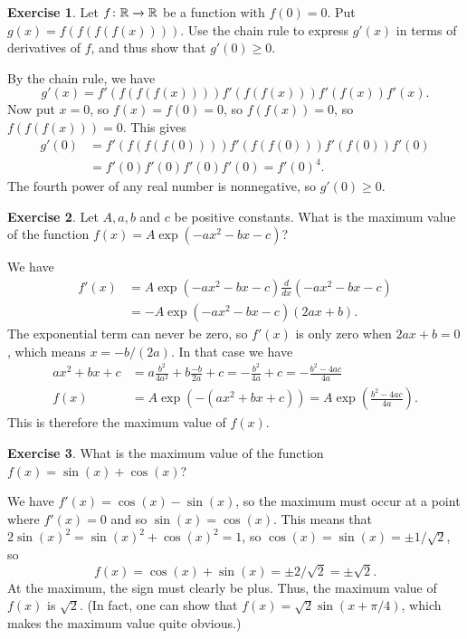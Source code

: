 \documentclass[a4paper]{amsart}
\theoremstyle{definition}
\newtheorem{exercise}{Exercise}[section]
\newenvironment{solution}{{\noindent \bf Solution:}}{}
\begin{document}
\begin{exercise}\label{ex-fix-pos}
Let $f\colon{\mathbb{R}}\xrightarrow{}{\mathbb{R}}$ be a function with $f(0)=0$.  Put
 $g(x)=f(f(f(f(x))))$.  Use the chain rule to express $g'(x)$
 in terms of derivatives of $f$, and thus show that
 $g'(0)\geq 0$.
\end{exercise}
\begin{solution}
By the chain rule, we have
 \[ g'(x) = f'(f(f(f(x)))) f'(f(f(x))) f'(f(x)) f'(x). \]
 Now put $x=0$, so $f(x)=f(0)=0$, so $f(f(x))=0$, so $f(f(f(x)))=0$.
 This gives
 \begin{align*}
  g'(0) &= f'(f(f(f(0)))) f'(f(f(0))) f'(f(0)) f'(0) \\
        &= f'(0) f'(0) f'(0) f'(0) = f'(0)^4.
 \end{align*}
 The fourth power of any real number is nonnegative, so
 $g'(0)\geq 0$.
\end{solution}
\begin{exercise}\label{ex-gaussmax}
Let $A,a,b$ and $c$ be positive constants.  What is the
 maximum value of the function $f(x)=A\exp(-ax^2-bx-c)$?
\end{exercise}
\begin{solution}
We have 
 \begin{align*}
  f'(x) &= A\exp(-ax^2-bx-c)\frac{d}{dx}(-ax^2-bx-c) \\
        &= -A\exp(-ax^2-bx-c)(2ax+b).
 \end{align*}
 The exponential term can never be zero, so $f'(x)$ is only
 zero when $2ax+b=0$, which means $x=-b/(2a)$.  In that case
 we have
 \begin{align*}
  ax^2+bx+c &= a\frac{b^2}{4a^2} +b\frac{-b}{2a} + c 
             = -\frac{b^2}{4a}+c  = -\frac{b^2-4ac}{4a} \\
  f(x) &= A\exp(-(ax^2+bx+c))
        = A\exp\left(\frac{b^2-4ac}{4a}\right).
 \end{align*}
 This is therefore the maximum value of $f(x)$.
\end{solution}
\begin{exercise}\label{ex-sincosmax}
What is the maximum value of the function
 $f(x)=\sin(x)+\cos(x)$?
\end{exercise}
\begin{solution}
We have $f'(x)=\cos(x)-\sin(x)$, so the maximum must occur
 at a point where $f'(x)=0$ and so $\sin(x)=\cos(x)$.  This
 means that $2\sin(x)^2=\sin(x)^2+\cos(x)^2=1$, so
 $\cos(x)=\sin(x)=\pm1/\sqrt{2}$, so
 \[ f(x)=\cos(x)+\sin(x)=\pm 2/\sqrt{2}=\pm\sqrt{2}. \]
 At the maximum, the sign must clearly be plus.  Thus, the
 maximum value of $f(x)$ is $\sqrt{2}$.  (In fact, one can
 show that $f(x)=\sqrt{2}\sin(x+\pi/4)$, which makes the
 maximum value quite obvious.)
\end{solution}
\end{document}
